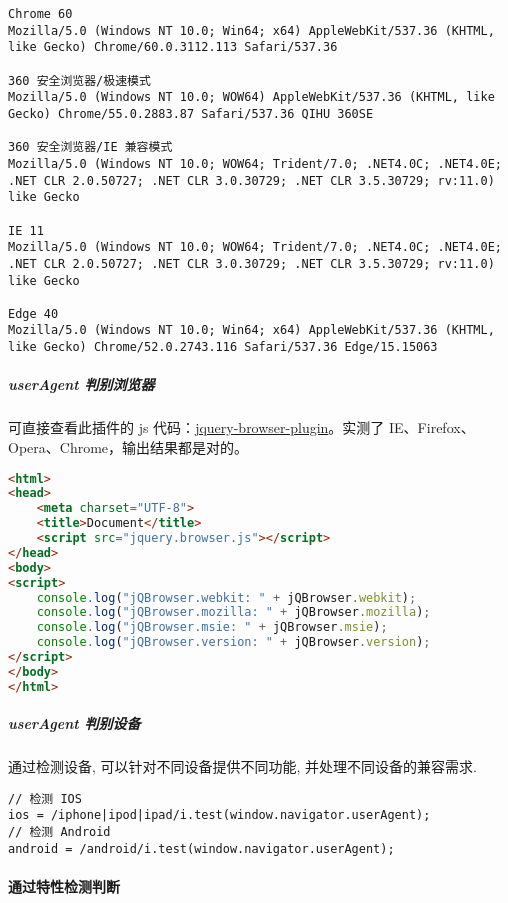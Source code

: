 \begin{lstlisting}
Chrome 60
Mozilla/5.0 (Windows NT 10.0; Win64; x64) AppleWebKit/537.36 (KHTML, like Gecko) Chrome/60.0.3112.113 Safari/537.36

360 安全浏览器/极速模式
Mozilla/5.0 (Windows NT 10.0; WOW64) AppleWebKit/537.36 (KHTML, like Gecko) Chrome/55.0.2883.87 Safari/537.36 QIHU 360SE

360 安全浏览器/IE 兼容模式
Mozilla/5.0 (Windows NT 10.0; WOW64; Trident/7.0; .NET4.0C; .NET4.0E; .NET CLR 2.0.50727; .NET CLR 3.0.30729; .NET CLR 3.5.30729; rv:11.0) like Gecko

IE 11
Mozilla/5.0 (Windows NT 10.0; WOW64; Trident/7.0; .NET4.0C; .NET4.0E; .NET CLR 2.0.50727; .NET CLR 3.0.30729; .NET CLR 3.5.30729; rv:11.0) like Gecko

Edge 40
Mozilla/5.0 (Windows NT 10.0; Win64; x64) AppleWebKit/537.36 (KHTML, like Gecko) Chrome/52.0.2743.116 Safari/537.36 Edge/15.15063
\end{lstlisting}

\subparagraph{userAgent
判别浏览器}\label{useragent-ux5224ux522bux6d4fux89c8ux5668}

可直接查看此插件的 js
代码：\href{https://github.com/gabceb/jquery-browser-plugin}{jquery-browser-plugin}。实测了
IE、Firefox、Opera、Chrome，输出结果都是对的。

\begin{lstlisting}[language=HTML]
<html>
<head>
    <meta charset="UTF-8">
    <title>Document</title>
    <script src="jquery.browser.js"></script>
</head>
<body>
<script>
    console.log("jQBrowser.webkit: " + jQBrowser.webkit);
    console.log("jQBrowser.mozilla: " + jQBrowser.mozilla);
    console.log("jQBrowser.msie: " + jQBrowser.msie);
    console.log("jQBrowser.version: " + jQBrowser.version);
</script>
</body>
</html>
\end{lstlisting}

\subparagraph{userAgent
判别设备}\label{useragent-ux5224ux522bux8bbeux5907}

通过检测设备, 可以针对不同设备提供不同功能, 并处理不同设备的兼容需求.

\begin{lstlisting}
// 检测 IOS
ios = /iphone|ipod|ipad/i.test(window.navigator.userAgent);
// 检测 Android
android = /android/i.test(window.navigator.userAgent);
\end{lstlisting}

\paragraph{通过特性检测判断}\label{ux901aux8fc7ux7279ux6027ux68c0ux6d4bux5224ux65ad}

